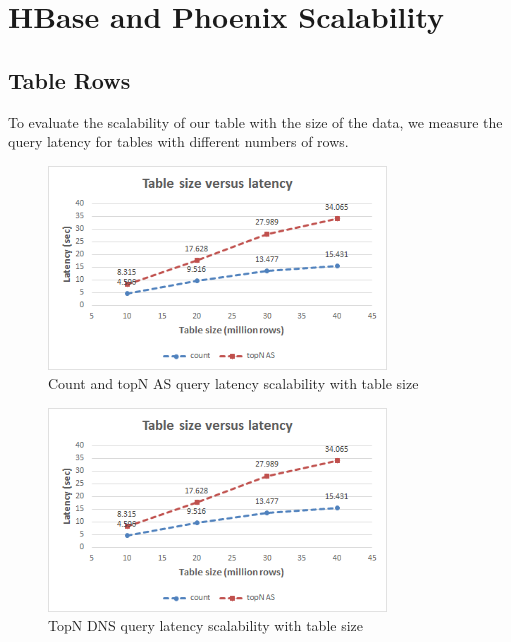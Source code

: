 \section{HBase and Phoenix Scalability}

\subsection{Table Rows}

To evaluate the scalability of our table with the size of the data, we measure the query latency for tables with different numbers of rows.

\begin{figure}[H]
\centering
\includegraphics[width=0.8\textwidth]{figures/benchmarks_hbase_rows_latency_1}
\caption{Count and topN AS query latency scalability with table size}
\label{figure:benchmarks_hbase_rows_latency_1}
\end{figure}

\begin{figure}[H]
\centering
\includegraphics[width=0.8\textwidth]{figures/benchmarks_hbase_rows_latency_1}
\caption{TopN DNS query latency scalability with table size}
\label{figure:benchmarks_hbase_rows_latency_2}
\end{figure}

